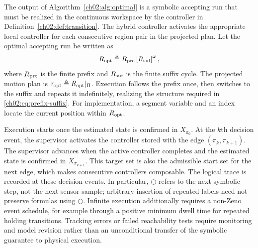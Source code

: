 The output of Algorithm~\ref{ch02:alg:optimal} is a symbolic accepting run that
must be realized in the continuous workspace by the controller in
Definition~\ref{ch02:def:transition}. The hybrid controller activates the
appropriate local controller for each consecutive region pair in the projected
plan. Let the optimal accepting run be written as
\begin{equation}
R_{\textup{opt}}
\triangleq
R_{\textup{pre}}
\left[R_{\textup{suf}}\right]^{\omega},
\label{ch02:eq:final-path}
\end{equation}
where $R_{\textup{pre}}$ is the finite prefix and $R_{\textup{suf}}$ is the
finite suffix cycle.
The projected motion plan is
$\tau_{\textup{opt}} \triangleq R_{\textup{opt}}|_{\Pi}$. Execution follows the
prefix once, then switches to the suffix and repeats it indefinitely, realizing
the structure required in \eqref{ch02:eq:prefix-suffix}.
For implementation, a segment variable and an index locate the current position
within $R_{\textup{opt}}$. 

\begin{revision}
Execution starts once the estimated state is confirmed in $X_{\pi_0}$.
At the $k$th decision event, the supervisor activates the controller stored
with the edge $(\pi_k,\pi_{k+1})$. The supervisor advances when the active
controller completes and the estimated state is confirmed in
$X_{\pi_{k+1}}$. This target set is also the admissible start set for
the next edge, which makes consecutive controllers composable.
The logical trace is recorded at these decision events. In particular,
$\bigcirc$ refers to the next symbolic step, not the next sensor sample;
arbitrary insertion of repeated labels need not preserve formulas using
$\bigcirc$. Infinite execution additionally requires a non-Zeno event
schedule, for example through a positive minimum dwell time for repeated
holding transitions. Tracking errors or failed reachability tests require
monitoring and model revision rather than an unconditional transfer of the
symbolic guarantee to physical execution.
\end{revision}

